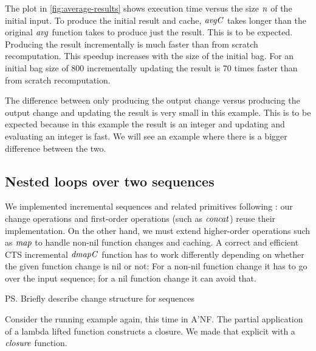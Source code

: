 The plot in \cref{fig:average-results} shows execution time versus the size
\ensuremath{\Varid{n}} of the initial input. To produce the initial result and cache, \ensuremath{\Varid{avgC}} takes
longer than the original \ensuremath{\Varid{avg}} function takes to produce just the result. This
is to be expected. Producing the result incrementally is much faster than from
scratch recomputation. This speedup increases with the size of the initial bag.
For an initial bag size of 800 incrementally updating the result is 70 times faster
than from scratch recomputation.

The difference between only producing the output change versus producing
the output change and updating the result is very small in this example. This is
to be expected because in this example the result is an integer and updating
and evaluating an integer is fast. We will see an example where there is a
bigger difference between the two.


\subsection{Nested loops over two sequences}
\label{sec:incr-nest-loop}

We implemented incremental sequences and related primitives following \citet{Firsov2016purely}: our
change operations and first-order operations (such as \ensuremath{\Varid{concat}}) reuse their
implementation. On the other hand, we must extend higher-order operations such
as \ensuremath{\Varid{map}} to handle non-nil function changes and caching. A correct and efficient
CTS incremental \ensuremath{\Varid{dmapC}} function has to work differently depending on whether the
given function change is nil or not: For a non-nil function change it has to
go over the input sequence; for a nil function change it can avoid that.

\ps{Briefly describe change structure for sequences}

Consider the running example again, this time in A'NF\@. The partial application of
a lambda lifted function constructs a closure. We made that explicit with a
\ensuremath{\Varid{closure}} function.

